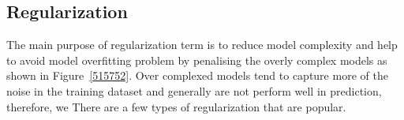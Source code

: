 \subsection{Regularization}

The main purpose of regularization term is to reduce model complexity and help to avoid model overfitting problem by penalising the overly complex models as shown in Figure~\ref{515752}. Over complexed models tend to capture more of the noise in the training dataset and generally are not perform well in prediction, therefore, we  There are a few types of regularization that are popular. 
